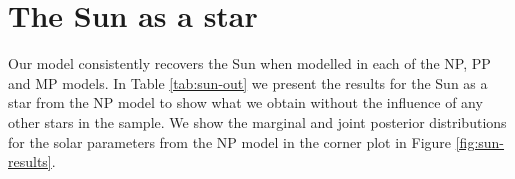 \documentclass[a4paper,fleqn,usenatbib]{mnras}
\begin{document}



\section{The Sun as a star}\label{sec:sun-res}


Our model consistently recovers the Sun when modelled in each of the NP, PP and MP models. In Table \ref{tab:sun-out} we present the results for the Sun as a star from the NP model to show what we obtain without the influence of any other stars in the sample. We show the marginal and joint posterior distributions for the solar parameters from the NP model in the corner plot in Figure \ref{fig:sun-results}.
\end{document}
